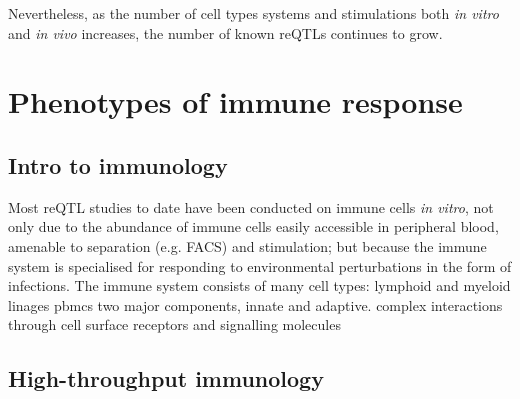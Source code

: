 \begin{outline}
    \2 Nevertheless, as the number of cell types systems and stimulations both \textit{in vitro} and \textit{in vivo} increases, the number of known reQTLs continues to grow.

\section{Phenotypes of immune response}

\subsection{Intro to immunology}
\1 Most \gls{reQTL} studies to date have been conducted on immune cells \textit{in vitro}, 
not only due to the abundance of immune cells easily accessible in peripheral blood, amenable to separation (e.g. FACS) and stimulation;
but because the immune system is specialised for responding to environmental perturbations in the form of infections.
    \2 The immune system consists of many cell types: lymphoid and myeloid linages
        \3 pbmcs
    \2 two major components, innate and adaptive.
    \2 complex interactions through cell surface receptors and signalling molecules


\subsection{High-throughput immunology}


\end{outline}
